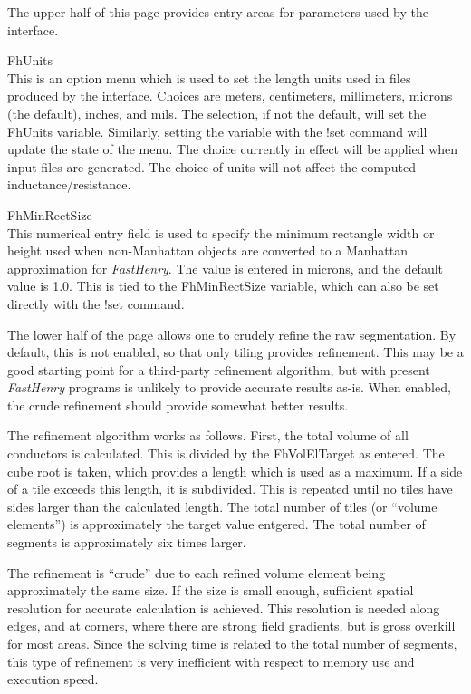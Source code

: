 The upper half of this page provides entry areas for parameters used
by the interface.

\begin{description}
\item{\cb FhUnits}\\
This is an option menu which is used to set the length units used in
files produced by the interface.  Choices are meters, centimeters,
millimeters, microns (the default), inches, and mils.  The selection,
if not the default, will set the {\et FhUnits} variable.  Similarly,
setting the variable with the {\cb !set} command will update the state
of the menu.  The choice currently in effect will be applied when
input files are generated.  The choice of units will not affect the
computed inductance/resistance.

\item{\cb FhMinRectSize}\\
This numerical entry field is used to specify the minimum rectangle
width or height used when non-Manhattan objects are converted to a
Manhattan approximation for {\it FastHenry}.  The value is entered in
microns, and the default value is 1.0.  This is tied to the {\et
FhMinRectSize} variable, which can also be set directly with the {\cb
!set} command.
\end{description}

The lower half of the page allows one to crudely refine the raw
segmentation.  By default, this is not enabled, so that only tiling
provides refinement.  This may be a good starting point for a
third-party refinement algorithm, but with present {\it FastHenry}
programs is unlikely to provide accurate results as-is.  When enabled,
the crude refinement should provide somewhat better results.

The refinement algorithm works as follows.  First, the total volume of
all conductors is calculated.  This is divided by the {\cb
FhVolElTarget} as entered.  The cube root is taken, which provides a
length which is used as a maximum.  If a side of a tile exceeds this
length, it is subdivided.  This is repeated until no tiles have sides
larger than the calculated length.  The total number of tiles (or
``volume elements'') is approximately the target value entgered.  The
total number of segments is approximately six times larger.

The refinement is ``crude'' due to each refined volume element being
approximately the same size.  If the size is small enough, sufficient
spatial resolution for accurate calculation is achieved.  This
resolution is needed along edges, and at corners, where there are
strong field gradients, but is gross overkill for most areas.  Since
the solving time is related to the total number of segments, this type
of refinement is very inefficient with respect to memory use and
execution speed.

